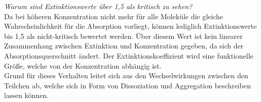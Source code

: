 \textit{Warum sind Extinktionswerte über 1,5 als kritisch zu sehen?}\\
Da bei höheren Konzentration nicht mehr für alle Moleküle die gleiche Wahrscheinlichkeit für die Absorption vorliegt, können lediglich Extinktionswerte bis 1,5 als nicht-kritisch bewertet werden. Über diesem Wert ist kein linearer Zusammenhang zwischen Extinktion und Konzentration gegeben, da sich der Absorptionsquerschnitt ändert. Der Extinktionskoeffizient wird eine funktionelle Größe, welche von der Konzentration abhängig ist.\\
Grund für dieses Verhalten leitet sich aus den Wechselwirkungen zwischen den Teilchen ab, welche sich in Form von Dissoziation und Aggregation beschreiben lassen können.\cite{extinktion}

 